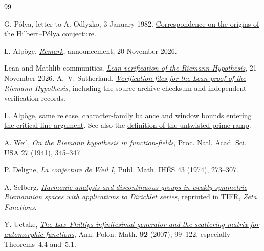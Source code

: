 \documentclass[11pt,letterpaper]{article}
\numberwithin{equation}{section}
\begin{document}
\begingroup\small
\begin{thebibliography}{99}
\setlength{\itemsep}{0.75pt}\setlength{\parsep}{0pt}\setlength{\parskip}{0pt}
 G. P\'olya, letter to A. Odlyzko, 3 January 1982.
\href{https://www-users.cse.umn.edu/~odlyzko/polya/index.html}{Correspondence on the origins of the Hilbert--P\'olya conjecture}.

 L. Alp\"oge, \href{https://alpo.ge/remark.pdf}{\emph{Remark}}, announcement, 20 November 2026.

 Lean and Mathlib communities, \href{https://leanprover-community.github.io/blog/posts/riemann-hypothesis/}{\emph{Lean verification of the Riemann Hypothesis}}, 21 November 2026.
A.~V. Sutherland, \href{https://math.mit.edu/~drew/grh/}{\emph{Verification files for the Lean proof of the Riemann Hypothesis}}, including the source archive checksum and independent verification records.

 L. Alp\"oge, same release, \href{https://github.com/TomasOrtega/RH/blob/a6ac91a412dcbaab31801355ec5707024a71bf65/extracted/lean/src/Development/AutomorphicArithmetic/DedekindLFunctions/LandauTheorems/ChBalance.lean\#L200-L209}{character-family balance} and \href{https://github.com/TomasOrtega/RH/blob/a6ac91a412dcbaab31801355ec5707024a71bf65/extracted/lean/src/Formalism/SizeWindowBrackets/GrowthBoundGivesRiemannHypothesis.lean\#L109-L121}{window bounds entering the critical-line argument}. See also the \href{https://github.com/leanprover-community/riemann-hypothesis/blob/40e56bab026552e089d7afcfeff08d2defb9c005/src/Formalism/StatementOC.lean\#L9-L13}{definition of the untwisted prime ramp}.

 A. Weil, \href{https://doi.org/10.1073/pnas.27.7.345}{\emph{On the Riemann hypothesis in function-fields}}, Proc. Natl. Acad. Sci. USA 27 (1941), 345--347.

 P. Deligne, \href{https://www.numdam.org/articles/10.1007/BF02684373/}{\emph{La conjecture de Weil I}}, Publ. Math. IH\'ES 43 (1974), 273--307.

 A. Selberg, \href{https://mathweb.tifr.res.in/Documents/Publications/Studies/Zeta_Functions.pdf}{\emph{Harmonic analysis and discontinuous groups in weakly symmetric Riemannian spaces with applications to Dirichlet series}}, reprinted in TIFR, \emph{Zeta Functions}.

 Y. Uetake, \href{https://doi.org/10.4064/ap92-2-1}{\emph{The Lax--Phillips infinitesimal generator and the scattering matrix for automorphic functions}}, Ann. Polon. Math. \textbf{92} (2007), 99--122, especially Theorems~4.4 and~5.1.


\end{thebibliography}
\end{document}
